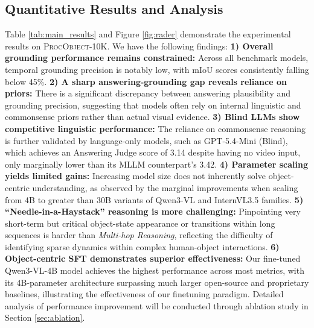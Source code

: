\subsection{Quantitative Results and Analysis}
\label{sec:results}

Table \ref{tab:main_results} and Figure \ref{fig:rader} demonstrate the experimental results on \textsc{\textsc{ProcObject-10K}}. We have the following findings: \textbf{1) Overall grounding performance remains constrained:} Across all benchmark models, temporal grounding precision is notably low, with mIoU scores consistently falling below 45\%. \textbf{2) A sharp answering-grounding gap reveals reliance on priors:} There is a significant discrepancy between answering plausibility and grounding precision, suggesting that models often rely on internal linguistic and commonsense priors rather than actual visual evidence. \textbf{3) Blind LLMs show competitive linguistic performance:} The reliance on commonsense reasoning is further validated by language-only models, such as GPT-5.4-Mini (Blind), which achieves an Answering Judge score of 3.14 despite having no video input, only marginally lower than its MLLM counterpart's 3.42. \textbf{4) Parameter scaling yields limited gains:} Increasing model size does not inherently solve object-centric understanding, as observed by the marginal improvements when scaling from 4B to greater than 30B variants of Qwen3-VL and InternVL3.5 families. \textbf{5) ``Needle-in-a-Haystack'' reasoning is more challenging:} Pinpointing very short-term but critical object-state appearance or transitions within long sequences is harder than \textit{Multi-hop Reasoning}, reflecting the difficulty of identifying sparse dynamics within complex human-object interactions. \textbf{6) Object-centric SFT demonstrates superior effectiveness:} Our fine-tuned Qwen3-VL-4B model achieves the highest performance across most metrics, with its 4B-parameter architecture surpassing much larger open-source and proprietary baselines, illustrating the effectiveness of our finetuning paradigm. Detailed analysis of performance improvement will be conducted through ablation study in Section \ref{sec:ablation}. 



